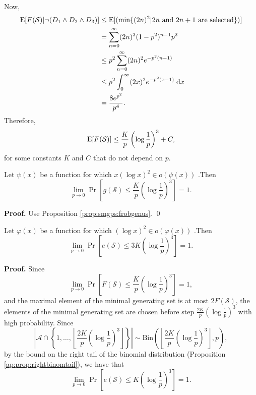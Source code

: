 Now,
\begin{align*}
    \mathrm{E}[F(\mathcal{S}) |\lnot(D_1 \land D_2 \land D_3)] &\leq \mathrm{E}[(\min\{(2n)^2|2n \text{ and } 2n + 1 \text{ are selected} \})]
    \\&= \sum_{n = 0}^\infty (2n)^2 (1 - p^2)^{n - 1}p^2
    \\&\leq p^2\sum_{n = 0}^\infty (2n)^2 e^{-p^2(n - 1)}
    \\&\leq p^2 \int_{0}^\infty (2x)^2 e^{-p^2(x - 1)}\;\mathrm{d}x
    \\&= \frac{8e^{p^2}}{p^4}.
\end{align*}
Therefore, 
\[\mathrm{E}[F(\mathcal{S})] \leq \frac{K}{p}\left(\log \frac{1}{p}\right)^3 + C,\]
for some constants $K$ and $C$ that do not depend on $p$.
\begin{corollary}
    Let $\psi(x)$ be a function for which $x(\log x)^2 \in o(\psi(x))$ .Then
    \[\lim_{p \to 0}\Pr\left[g(\mathcal{S}) \leq \frac{K}{p}\left(\log \frac{1}{p}\right)^3\right] = 1.\]
\end{corollary}
\textbf{Proof. } Use Proposition \ref{prop:smgps:frobgenus}. \qed
\begin{corollary}
    Let $\varphi(x)$ be a function for which $(\log x)^2 \in o(\varphi(x))$ .Then
    \[\lim_{p \to 0}\Pr\left[e(\mathcal{S}) \leq 3K\left(\log \frac{1}{p}\right)^3\right] = 1.\]
\end{corollary}
\textbf{Proof. } Since
\[\lim_{p \to 0}\Pr\left[F(\mathcal{S}) \leq \frac{K}{p}\left(\log \frac{1}{p}\right)^3\right] = 1,\]
and the maximal element of the minimal generating set is at most $2F(\mathcal{S})$, the elements of the minimal generating set are chosen before step $\frac{2K}{p}\left(\log \frac{1}{p}\right)^3$ with high probability. Since 
\[\left|\mathcal{A}\cap\left\{1, \ldots, \left\lfloor\frac{2K}{p}\left(\log \frac{1}{p}\right)^3\right \rfloor\right\}\right| \sim \mathrm{Bin}\left(\left\lfloor\frac{2K}{p}\left(\log \frac{1}{p}\right)^3\right \rfloor, p\right),\]
 by the bound on the right tail of the binomial distribution (Proposition \ref{ap:prop:rightbinomtail}), we have that
\[\lim_{p \to 0}\Pr\left[e(\mathcal{S}) \leq K\left(\log \frac{1}{p}\right)^3\right] = 1.\]
